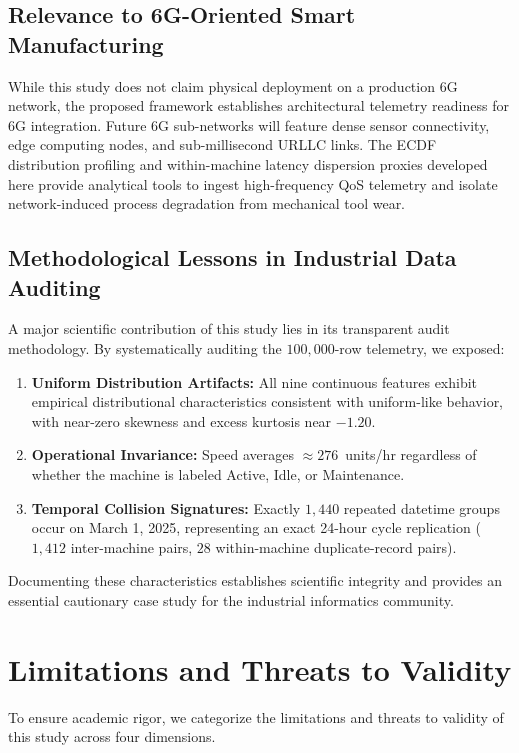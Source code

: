 \documentclass[journal]{IEEEtran}
\begin{document}
\subsection{Relevance to 6G-Oriented Smart Manufacturing}
While this study does not claim physical deployment on a production 6G network, the proposed framework establishes architectural telemetry readiness for 6G integration. Future 6G sub-networks will feature dense sensor connectivity, edge computing nodes, and sub-millisecond URLLC links. The ECDF distribution profiling and within-machine latency dispersion proxies developed here provide analytical tools to ingest high-frequency QoS telemetry and isolate network-induced process degradation from mechanical tool wear.

\subsection{Methodological Lessons in Industrial Data Auditing}
A major scientific contribution of this study lies in its transparent audit methodology. By systematically auditing the $100{,}000$-row telemetry, we exposed:
\begin{enumerate}
    \item \textbf{Uniform Distribution Artifacts:} All nine continuous features exhibit empirical distributional characteristics consistent with uniform-like behavior, with near-zero skewness and excess kurtosis near $-1.20$.
    \item \textbf{Operational Invariance:} Speed averages $\approx 276$~units/hr regardless of whether the machine is labeled Active, Idle, or Maintenance.
    \item \textbf{Temporal Collision Signatures:} Exactly $1{,}440$ repeated datetime groups occur on March 1, 2025, representing an exact 24-hour cycle replication ($1{,}412$ inter-machine pairs, $28$ within-machine duplicate-record pairs).
\end{enumerate}
Documenting these characteristics establishes scientific integrity and provides an essential cautionary case study for the industrial informatics community.

\section{Limitations and Threats to Validity}
\label{sec:limitations}

To ensure academic rigor, we categorize the limitations and threats to validity of this study across four dimensions.
\end{document}
